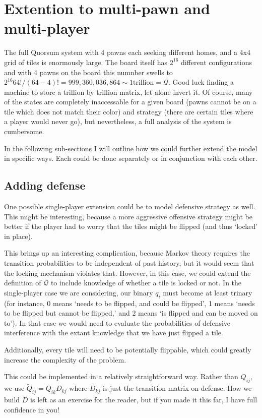 \documentclass[letterpaper,11pt]{article}
\begin{document}
\section{Extention to multi-pawn and multi-player}
The full Quorsum system with 4 pawns each seeking different homes, and a 4x4
grid of tiles is enormously large.  The board itself has $2^{16}$ different
configurations and with 4 pawns on the board this numnber swells to 
$2^{16} 64!/(64-4)! = 999,360,036,864 \sim \mathrm{1 trillion}=\mathcal{Q}$.
Good luck finding a machine to store a trillion by trillion matrix, let alone
invert it.  Of course, many of the states are completely inaccessable for a
given board (pawns cannot be on a tile which does not match their color)
and strategy (there are certain tiles where a player would never go), but
nevertheless, a full analysis of the system is cumbersome.

In the following sub-sections I will outline how we could further extend the
model in specific ways.  Each could be done separately or in conjunction with
each other. 

\subsection{Adding defense}
One possible single-player extension could be to model defensive strategy as
well.  This might be interesting, because a more aggressive offensive strategy
might be better if the player had to worry that the tiles might be flipped (and
thus `locked' in place).

This brings up an interesting complication, because Markov theory requires the
transition probabilities to be independent of past history, but it would seem
that the locking mechanism violates that.  However, in this case, we could
extend the definition of $\mathcal{Q}$ to include knowledge of whether a tile
is locked or not.  In the single-player case we are considering, our binary 
$q_i$ must become at least trinary (for instance, 0 means `needs to be flipped,
and could be flipped', 1 means `needs to be flipped but cannot be flipped,'
and 2 means `is flipped and can be moved on to').  In that case we would need
to evaluate the probabilities of defensive interference with the extant
knowledge that we have just flipped a tile.

Additionally, every tile will need to be potentially flippable, which could
greatly increase the complexity of the problem.

This could be implemented in a relatively straightforward way.  Rather than
$Q_{ij}$, we use $\tilde{Q}_{ij} = Q_{ik}D_{kj}$ where $D_{kj}$ is just the
transition matrix on defense.  How we build $D$ is left as an exercise for the
reader, but if you made it this far, I have full confidence in you!
\end{document}
